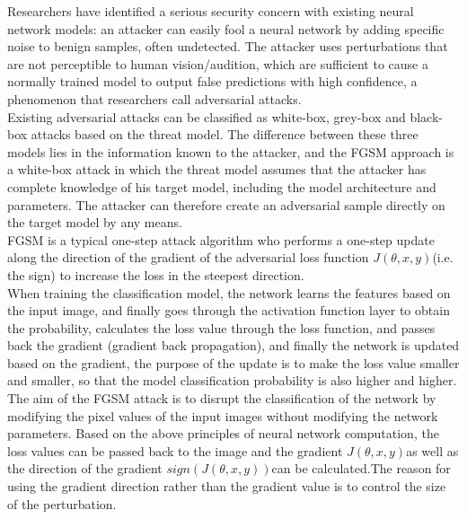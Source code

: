 

Researchers have identified a serious security concern with existing neural network models: an attacker can easily fool a neural network by adding specific noise to benign samples, often undetected. The attacker uses perturbations that are not perceptible to human vision/audition, which are sufficient to cause a normally trained model to output false predictions with high confidence, a phenomenon that researchers call adversarial attacks.
\\

Existing adversarial attacks can be classified as white-box, grey-box and black-box attacks based on the threat model. The difference between these three models lies in the information known to the attacker, and the FGSM approach is a white-box attack in which the threat model assumes that the attacker has complete knowledge of his target model, including the model architecture and parameters. The attacker can therefore create an adversarial sample directly on the target model by any means. \\

FGSM is a typical one-step attack algorithm who performs a one-step update along the direction of the gradient of the adversarial loss function $J(\theta, x, y)$(i.e. the sign) to increase the loss in the steepest direction.\\

When training the classification model, the network learns the features based on the input image, and finally goes through the activation function layer to obtain the probability, calculates the loss value through the loss function, and passes back the gradient (gradient back propagation), and finally the network is updated based on the gradient, the purpose of the update is to make the loss value smaller and smaller, so that the model classification probability is also higher and higher.\\

The aim of the FGSM attack is to disrupt the classification of the network by modifying the pixel values of the input images without modifying the network parameters. Based on the above principles of neural network computation, the loss values can be passed back to the image and the gradient $J(\theta, x, y)$as well as the direction of the gradient $sign(J(\theta, x, y))$can be calculated.The reason for using the gradient direction rather than the gradient value is to control the size of the perturbation.\\


